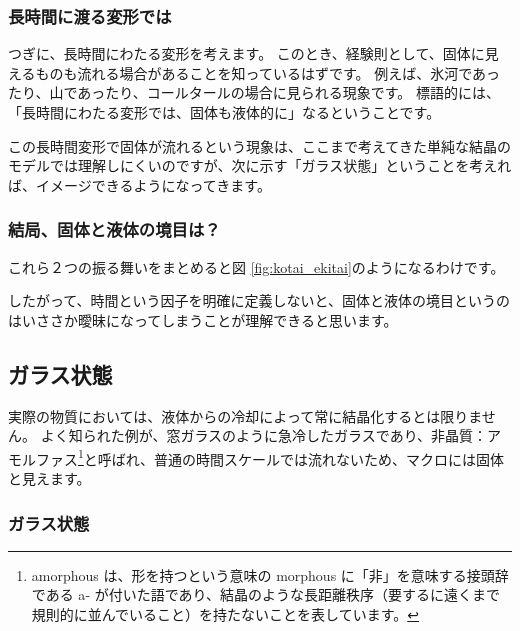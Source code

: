 \documentclass[uplatex,dvipdfmx,a4paper,11pt]{jsarticle}
\begin{document}
\subsubsection{長時間に渡る変形では}
つぎに、長時間にわたる変形を考えます。
このとき、経験則として、固体に見えるものも流れる場合があることを知っているはずです。
例えば、氷河であったり、山であったり、コールタールの場合に見られる現象です。
標語的には、「長時間にわたる変形では、固体も液体的に」なるということです。

この長時間変形で固体が流れるという現象は、ここまで考えてきた単純な結晶のモデルでは理解しにくいのですが、次に示す「ガラス状態」ということを考えれば、イメージできるようになってきます。

\subsubsection{結局、固体と液体の境目は？}
これら２つの振る舞いをまとめると図 \ref{fig:kotai_ekitai}のようになるわけです。

したがって、時間という因子を明確に定義しないと、固体と液体の境目というのはいささか曖昧になってしまうことが理解できると思います。

\subsection{ガラス状態}

実際の物質においては、液体からの冷却によって常に結晶化するとは限りません。
よく知られた例が、窓ガラスのように急冷したガラスであり、非晶質：アモルファス\footnote{
	amorphous は、形を持つという意味の morphous に「非」を意味する接頭辞である a‐ が付いた語であり、結晶のような長距離秩序（要するに遠くまで規則的に並んでいること）を持たないことを表しています。
}と呼ばれ、普通の時間スケールでは流れないため、マクロには固体と見えます。

\subsubsection{ガラス状態}
\end{document}
